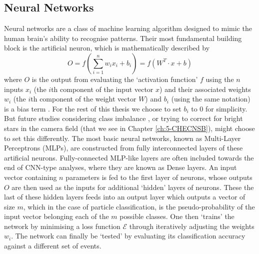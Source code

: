 \subsection{Neural Networks}
Neural networks are a class of machine learning algorithm designed to mimic the human brain's ability to recognise patterns. Their most fundamental building block is the artificial neuron, which is mathematically described by
\begin{equation}
O=\mathit{f}(\sum_{i=1}^{n}w_ix_i+b_i)=\mathit{f}(W^T\cdot x +b)
\end{equation}
where $O$ is the output from evaluating the `activation function' $\mathit{f}$ using the $n$ inputs $x_i$ (the $i$th component of the input vector $x$) and their associated weights $w_i$ (the $i$th component of the weight vector $W$) and $b_i$ (using the same notation) is a bias term \cite{C++CNN}. For the rest of this thesis we choose to set $b_i$ to 0 for simplicity. But future studies considering class imbalance \cite{imbalance}, or trying to correct for bright stars in the camera field (that we see in Chapter \ref{ch:5-CHECNSB}), might choose to set this differently. The most basic neural networks, known as Multi-Layer Perceptrons (MLPs), are constructed from fully interconnected layers of these artificial neurons. Fully-connected MLP-like layers are often included towards the end of CNN-type analyses, where they are known as Dense layers. An input vector containing $n$ parameters is fed to the first layer of neurons, whose outputs $O$ are then used as the inputs for additional `hidden' layers of neurons. These the last of these hidden layers feeds into an output layer which outputs a vector of size $m$, which in the case of particle classification, is the pseudo-probability of the input vector belonging each of the $m$ possible classes. One then `trains' the network by minimising a loss function $\mathcal{E}$ through iteratively adjusting the weights $w_i$.
The network can finally be `tested' by evaluating its classification accuracy against a different set of events.
